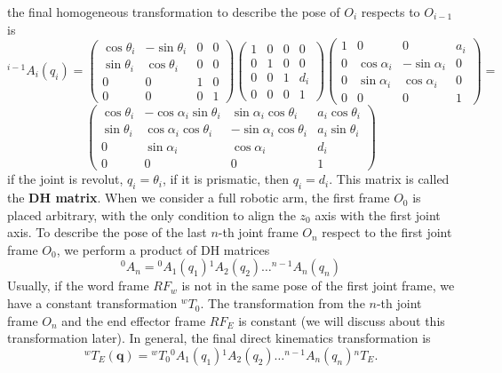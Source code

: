 \documentclass[10pt, letterpaper]{report}
\begin{document}
the final homogeneous transformation to describe the pose of $O_{i}$ respects to $O_{i-1}$ is\begin{equation}
    {}^{i-1}A_i(q_i)=\begin{pmatrix}
        \cos\theta_i&-\sin\theta_i&0&0\\ 
        \sin\theta_i&\cos\theta_i&0&0\\ 
        0&0&1&0\\ 
        0&0&0&1
    \end{pmatrix}\begin{pmatrix}
        1&0&0&0\\ 
        0&1&0&0\\ 
        0&0&1&d_i\\ 
        0&0&0&1
    \end{pmatrix} \begin{pmatrix}
       1&0&0&a_i\\ 
       0&\cos\alpha_i&-\sin\alpha_i&0\\ 
        0&\sin\alpha_i&\cos\alpha_i&0\\ 
        0&0&0&1
    \end{pmatrix}=\end{equation}  \begin{equation}
    \begin{pmatrix}
        \cos\theta_i&-\cos\alpha_i\sin\theta_i&\sin\alpha_i\cos\theta_i&a_i\cos\theta_i\\ 
        \sin\theta_i&\cos\alpha_i\cos\theta_i&-\sin\alpha_i\cos\theta_i&a_i\sin\theta_i\\ 
        0&\sin\alpha_i&\cos\alpha_i&d_i\\ 
        0&0&0&1
    \end{pmatrix}
\end{equation} 
if the joint is revolut, $q_i=\theta_i$, if it is prismatic, then $q_i=d_i$. This matrix is called the \textbf{DH matrix}. When we consider a full robotic arm, the first frame $O_0$ is placed arbitrary, with the only condition to align the $z_0$ axis with the first joint axis. To describe the pose of the last $n$-th joint frame $O_n$ respect to the first joint frame $O_0$, we perform a product of DH matrices\begin{equation}
    {}^0A_n={}^0A_1(q_1){}^1A_2(q_2)\dots {}^{n-1}A_n(q_n)
\end{equation}
Usually, if the word frame $RF_w$ is not in the same pose of the first joint frame, we have a constant transformation ${}^wT_0$. The transformation from the $n$-th joint frame $O_n$ and the end effector frame $RF_E$ is constant (we will discuss about this transformation later). In general, the final direct kinematics  transformation   is\begin{equation}
    {}^wT_E(\mathbf q)={}^wT_0{}^0A_1(q_1){}^1A_2(q_2)\dots {}^{n-1}A_n(q_n){}^nT_E.
\end{equation}
\end{document}
